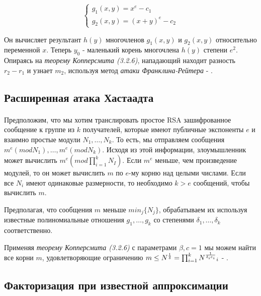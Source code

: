     \begin{equation}
	  \begin{cases}
	    g_1(x,y) = x^e - c_1 \\
	    g_2(x,y) = (x+y)^e - c_2
	  \end{cases}    
      \end{equation}
      
  Он вычисляет результант $h(y)$ многочленов $g_1(x,y)$ и $g_2(x,y)$ относительно переменной $x$. Теперь $y_0$ -
  маленький корень многочлена $h(y)$ степени $e^2$. Опираясь на \textit{теорему Копперсмита (3.2.6)}, нападающий находит разность $r_2 - r_1$ и 
  узнает $m_2$, используя метод \textit{атаки Франклина-Рейтера} - \cite[страницы 331-332]{may10}.

\subsection{Расширенная атака Хастаадта}

\paragraph{} Предположим, что мы хотим транслировать простое RSA зашифрованное сообщение к группе из {$k$} получателей, которые имеют публичные
  экспоненты {$e$} и взаимно простые модули {$N_1, \dots, N_k$}. То есть, мы отправляем сообщения {$m^e (mod N_1), \dots, m^e (mod N_k)$}. 
  Исходя из этой информации, злоумышленник может вычислить {$m^e (mod \prod_{i=1}^{k}{N_I})$}. Если {$m^e$} меньше, чем произведение модулей, то он 
  может вычислить {$m$} по {$e$}-му корню над целыми числами. Если все {$N_i$} имеют одинаковые размерности, то необходимо {$k > e$} сообщений,
  чтобы вычислить {$m$}.
  
  Предполагая, что сообщения {$m$} меньше {$min_j \{ N_j \}$}, обрабатываем их используя известные полиномиальные отношения {$g_1, \dots, g_k$}
  со степенями {$\delta_1, \dots, \delta_k$} соответственно.
  
  Применяя \textit{теорему Копперсмита (3.2.6)} с параметрами {$\beta,c=1$} мы можем найти все корни {$m$}, удовлетворяющие ограничению
  {$m \le N^\frac{1}{\delta} = \prod_{i=1}^{k}{N\textsuperscript{{$\frac{1}{\delta_i e_i}$}}_i}$} - \cite[страницы 331-333]{may10}.

\subsection{Факторизация при известной аппроксимации}

